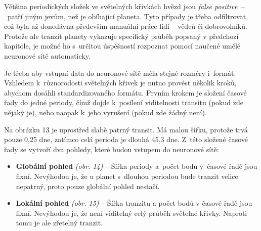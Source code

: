 \documentclass[a4paper,12pt]{article}
\begin{document}
{{Většina periodických složek ve světelných křivkách hvězd jsou \emph{false positive}~--~patří jiným jevům, než je obíhající planeta. Tyto případy je třeba odfiltrovat, což byla až donedávna především manuální práce lidí -- vědců či dobrovolníků. Protože ale tranzit planety vykazuje specifický průběh popsaný v předchozí kapitole, je možné ho s~určitou úspěšností rozpoznat pomocí naučené umělé neuronové sítě automaticky.~\cite{kepler80}

\begin{multicols}{2}
\end{multicols}

\begin{multicols}{2}
\end{multicols}

Je třeba aby vstupní data do neuronové sítě měla stejné rozměry i~formát. Vzhledem k~různorodosti světelných křivek je nutno provést několik kroků, abychom dosáhli standardizovaného formátu. Prvním krokem je složení časové řady do jedné periody, čímž dojde k~posílení viditelnosti transitu (pokud zde nějaký je), nebo naopak k~jeho vyrušení (pokud zde žádný není).~\cite{kepler80}

\begin{multicols}{2}
\end{multicols}

\vspace{\fill}

Na obrázku 13 je uprostřed slabě patrný transit. Má malou šířku, protože trvá pouze 0,25 dne, zatímco celá perioda je dlouhá 45,3 dne. Z~této složené časové řady se vytvoří dva pohledy, které budou vstupem do neuronové sítě:

\begin{itemize}
\item \textbf{Globální pohled} \emph{(obr. 14)} -- Šířka periody a~počet bodů v~časové řadě jsou fixní. Nevýhodou je, že u planet s~dlouhou periodou bude tranzit velice nepatrný, proto pouze globální pohled nestačí.~\cite{kepler80}
\item \textbf{Lokální pohled} \emph{(obr. 15)} -- Šířka tranzitu a počet bodů v časové řadě jsou fixní. Nevýhodou je, že není viditelný celý průběh světelné křivky. Naproti tomu je ale zřetelný tranzit.~\cite{kepler80}
\end{itemize}

}}
\end{document}
